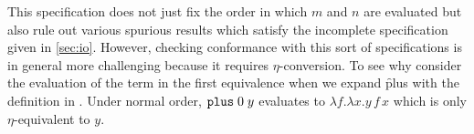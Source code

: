 This specification does not just fix the order in which $m$
and $n$ are evaluated but also rule out various spurious
results which satisfy the incomplete specification given in
\cref{sec:io}.
%
However, checking conformance with this sort of
specifications is in general more challenging because it
requires $\eta$-conversion.
%
To see why consider the evaluation of the term in the first
equivalence when we expand \f{plus} with the definition in
.
%
Under normal order, $\texttt{plus}\;0\;y$ evaluates to $\lambda
f.\lambda x. y\,f\,x$ which is only $\eta$-equivalent to
$y$.

